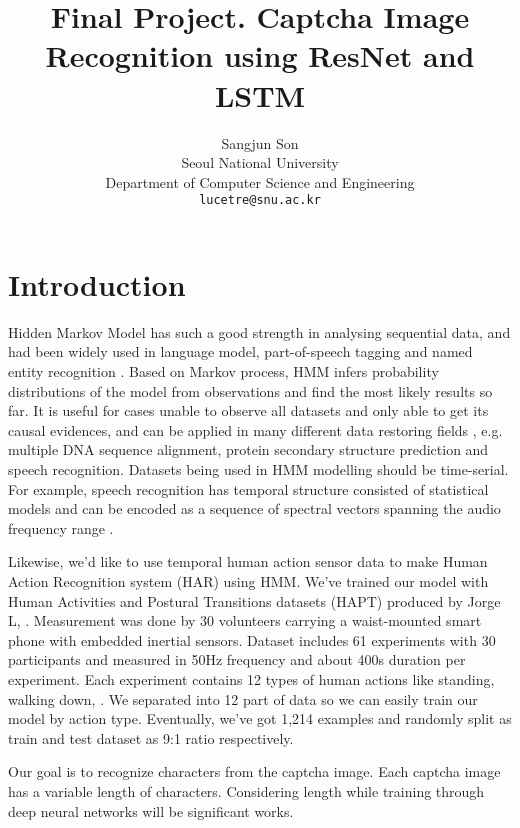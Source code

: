 \documentclass[10pt,twocolumn,letterpaper]{article}
\begin{document}
\title{Final Project. Captcha Image Recognition using ResNet and LSTM}

\author{Sangjun Son\\
Seoul National University\\
Department of Computer Science and Engineering\\
{\tt\small lucetre@snu.ac.kr}
}

\maketitle

\section{Introduction}

Hidden Markov Model has such a good strength in analysing sequential data, and had been widely used in language model, part-of-speech tagging and named entity recognition \cite{ratgo}. Based on Markov process, HMM infers probability distributions of the model from observations and find the most likely results so far. It is useful for cases unable to observe all datasets and only able to get its causal evidences, and can be applied in many different data restoring fields \cite{hmmwiki}, e.g. multiple DNA sequence alignment, protein secondary structure prediction \cite{biology} and speech recognition. Datasets being used in HMM modelling should be time-serial. For example, speech recognition has temporal structure consisted of statistical models and can be encoded as a sequence of spectral vectors spanning the audio frequency range \cite{speechrecognition}.

Likewise, we'd like to use temporal human action sensor data to make Human Action Recognition system (HAR) using HMM. We've trained our model with  Human Activities and Postural Transitions datasets (HAPT) produced by Jorge L, \etal \cite{hapt}. Measurement was done by 30 volunteers carrying a waist-mounted smart phone with embedded inertial sensors. Dataset includes 61 experiments with 30 participants and measured in 50Hz frequency and about 400s duration per experiment. Each experiment contains 12 types of human actions like standing, walking down, \etc. We separated into 12 part of data so we can easily train our model by action type. Eventually, we've got 1,214 examples and randomly split as train and test dataset as 9:1 ratio respectively.

Our goal is to recognize characters from the captcha image.
Each captcha image has a variable length of characters. 
Considering length while training through deep neural networks will be significant works.
\end{document}
